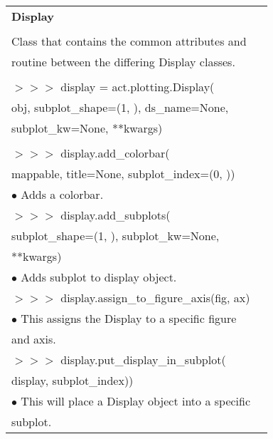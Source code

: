 \documentclass[potrait, z1paper, fontscale=0.33]{baposter} %
\begin{document}
\begin{poster}
{\begin{flushleft}
\begin{tabular}{@{}ll@{}}
\multicolumn{2}{l}{\cellcolor[HTML]{DDFFFF}\bf Display} \\
\\
Class that contains the common attributes and\\
routine between the differing Display classes.\\
\\
$>$$>$$>$ display = act.plotting.Display(\\
\-\hspace{1.2cm} obj, subplot\_shape=(1, ), ds\_name=None,\\
\-\hspace{1.2cm} subplot\_kw=None, **kwargs)\\
\\
$>$$>$$>$ display.add\_colorbar(\\
\-\hspace{1.2cm} mappable, title=None, subplot\_index=(0, ))\\
\-\hspace{0.2cm} $\bullet$ Adds a colorbar.\\
$>$$>$$>$ display.add\_subplots(\\
\-\hspace{1.2cm} subplot\_shape=(1, ), subplot\_kw=None,\\
\-\hspace{1.2cm} **kwargs)\\
\-\hspace{0.5cm} $\bullet$ Adds subplot to display object.\\
$>$$>$$>$ display.assign\_to\_figure\_axis(fig, ax)\\
\-\hspace{0.2cm} $\bullet$ This assigns the Display to a specific figure\\
\-\hspace{0.5cm} and axis.\\
$>$$>$$>$ display.put\_display\_in\_subplot(\\
\-\hspace{1.2cm} display, subplot\_index))\\
\-\hspace{0.2cm} $\bullet$ This will place a Display object into a specific\\
\-\hspace{0.5cm} subplot.
\end{tabular}


\end{flushleft}}
\end{poster}
\end{document}
